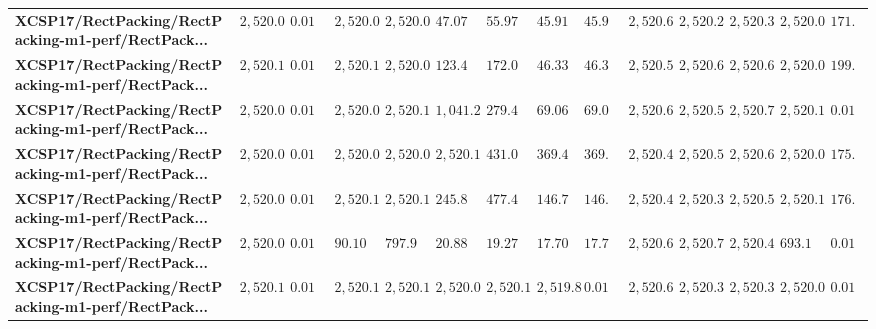 \begin{tabular}{llllllllllllll}
\textbf{XCSP17/RectPacking/RectPacking-m1-perf/RectPack...} &        $2,520.05$ &   $0.012006$ &    $2,520.07$ &      $2,520.07$ &                                  $47.0746$ &                               $55.9715$ &           $45.9191$ &   $45.9191$ &              $2,520.68$ &              $2,520.23$ &              $2,520.31$ &              $2,520.09$ &   $171.477$ \\
\textbf{XCSP17/RectPacking/RectPacking-m1-perf/RectPack...} &        $2,520.11$ &   $0.012617$ &     $2,520.1$ &      $2,520.06$ &                                  $123.498$ &                               $172.031$ &           $46.3348$ &   $46.3348$ &              $2,520.51$ &              $2,520.63$ &              $2,520.64$ &              $2,520.03$ &   $199.915$ \\
\textbf{XCSP17/RectPacking/RectPacking-m1-perf/RectPack...} &        $2,520.08$ &   $0.012869$ &    $2,520.06$ &      $2,520.11$ &                                 $1,041.24$ &                               $279.437$ &           $69.0695$ &   $69.0695$ &              $2,520.66$ &              $2,520.53$ &              $2,520.74$ &              $2,520.13$ &  $0.011988$ \\
\textbf{XCSP17/RectPacking/RectPacking-m1-perf/RectPack...} &        $2,520.06$ &   $0.013023$ &    $2,520.05$ &      $2,520.08$ &                                 $2,520.11$ &                                 $431.0$ &           $369.492$ &   $369.492$ &              $2,520.48$ &              $2,520.51$ &              $2,520.61$ &              $2,520.09$ &   $175.776$ \\
\textbf{XCSP17/RectPacking/RectPacking-m1-perf/RectPack...} &        $2,520.05$ &   $0.013008$ &    $2,520.14$ &      $2,520.13$ &                                  $245.808$ &                               $477.486$ &           $146.729$ &   $146.729$ &              $2,520.49$ &              $2,520.35$ &              $2,520.58$ &              $2,520.12$ &   $176.632$ \\
\textbf{XCSP17/RectPacking/RectPacking-m1-perf/RectPack...} &        $2,520.02$ &   $0.013092$ &      $90.109$ &       $797.925$ &                                  $20.8806$ &                               $19.2792$ &           $17.7062$ &   $17.7062$ &              $2,520.61$ &              $2,520.71$ &              $2,520.41$ &               $693.178$ &  $0.012416$ \\
\textbf{XCSP17/RectPacking/RectPacking-m1-perf/RectPack...} &        $2,520.11$ &   $0.013349$ &    $2,520.12$ &      $2,520.13$ &                                 $2,520.08$ &                              $2,520.13$ &           $2,519.8$ &  $0.012691$ &              $2,520.64$ &              $2,520.37$ &              $2,520.39$ &              $2,520.08$ &  $0.012691$ \\

\end{tabular}
